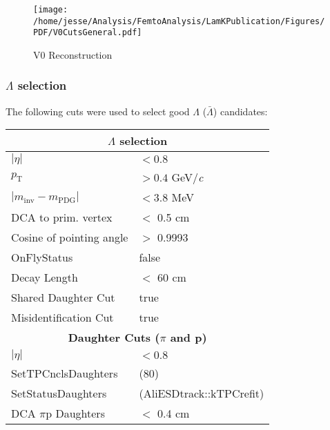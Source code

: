\documentclass[ALICE,manyauthors]{cernphprep}
\begin{document}
\begin{figure}[h]
  \centering
  \texttt{[image: /home/jesse/Analysis/FemtoAnalysis/LamKPublication/Figures/PDF/V0CutsGeneral.pdf]}
  \caption[V0 Reconstruction]{V0 Reconstruction}
  \label{fig:V0Reconstruction}
\end{figure}


\subsubsection{$\Lambda$ selection}
\label{sec:LambdaSelection}
The following cuts were used to select good $\Lambda$ ($\bar{\Lambda}$) candidates: 


\begin{table}[htbp]
 \centering 
  \begin{tabular}{lc|c|l}
   \hline  
   \multicolumn{4}{c}{\textbf{$\Lambda$ selection}} \\
   \hline
   \multicolumn{3}{l|}{$|\eta|$} & $< 0.8$ \\
   \hline
   \multicolumn{3}{l|}{$p_{\mathrm{T}}$} & $> 0.4$ GeV/\textit{c} \\
   \hline
   \multicolumn{3}{l|}{$|m_{\mathrm{inv}} - m_{\mathrm{PDG}}|$} & $< 3.8$ MeV \\ 
   \hline
   \multicolumn{3}{l|}{DCA to prim. vertex} & $<$ 0.5 cm \\
   \hline
   \multicolumn{3}{l|}{Cosine of pointing angle} & $>$ 0.9993 \\
   \hline
   \multicolumn{3}{l|}{OnFlyStatus} & false \\
   \hline
   \multicolumn{3}{l|}{Decay Length} & $<$ 60 cm \\
   \hline
   \multicolumn{3}{l|}{Shared Daughter Cut} & true \\
   \hline
   \multicolumn{3}{l|}{Misidentification Cut} & true \\
   \hline   
   
   
   \multicolumn{4}{c}{\textbf{Daughter Cuts ($\pi$ and p)}} \\
   \hline
   \multicolumn{3}{l|}{$|\eta|$} &  $< 0.8$ \\
   \hline
   \multicolumn{3}{l|}{SetTPCnclsDaughters} & (80) \\
   \hline
   \multicolumn{3}{l|}{SetStatusDaughters} & (AliESDtrack::kTPCrefit) \\
   \hline
   \multicolumn{3}{l|}{DCA $\pi$p Daughters} & $<$ 0.4 cm \\
   \hline
   

\end{tabular}
\end{table}
\end{document}
